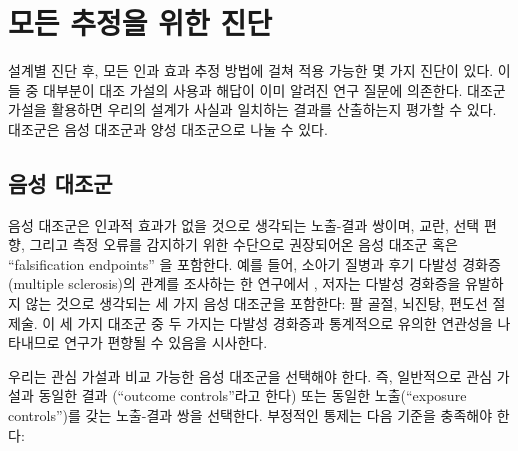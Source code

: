 \documentclass[11pt]{book}
\theoremstyle{definition}
\theoremstyle{definition}
\theoremstyle{definition}
\theoremstyle{remark}
\begin{document}
\section{모든 추정을 위한 진단}\label{---}

설계별 진단 후, 모든 인과 효과 추정 방법에 걸쳐 적용 가능한 몇 가지
진단이 있다. 이들 중 대부분이 대조 가설의 사용과 해답이 이미 알려진 연구
질문에 의존한다. 대조군 가설을 활용하면 우리의 설계가 사실과 일치하는
결과를 산출하는지 평가할 수 있다. 대조군은 음성 대조군과 양성 대조군으로
나눌 수 있다.

\subsection{음성 대조군}\label{NegativeControls}


음성 대조군은 인과적 효과가 없을 것으로 생각되는 노출-결과 쌍이며, 교란,
\citep{lipsitch_2010} 선택 편향, 그리고 측정 오류를 감지하기 위한
수단으로 권장되어온 음성 대조군 혹은 ``falsification
endpoints''\citep{prased_2013} 을 포함한다. \citep{arnold_2016} 예를
들어, 소아기 질병과 후기 다발성 경화증 (multiple sclerosis)의 관계를
조사하는 한 연구에서 \citep{zaadstra_2008}, 저자는 다발성 경화증을
유발하지 않는 것으로 생각되는 세 가지 음성 대조군을 포함한다: 팔 골절,
뇌진탕, 편도선 절제술. 이 세 가지 대조군 중 두 가지는 다발성 경화증과
통계적으로 유의한 연관성을 나타내므로 연구가 편향될 수 있음을 시사한다.

우리는 관심 가설과 비교 가능한 음성 대조군을 선택해야 한다. 즉,
일반적으로 관심 가설과 동일한 결과 (``outcome controls''라고 한다) 또는
동일한 노출(``exposure controls'')를 갖는 노출-결과 쌍을 선택한다.
부정적인 통제는 다음 기준을 충족해야 한다:
\end{document}
